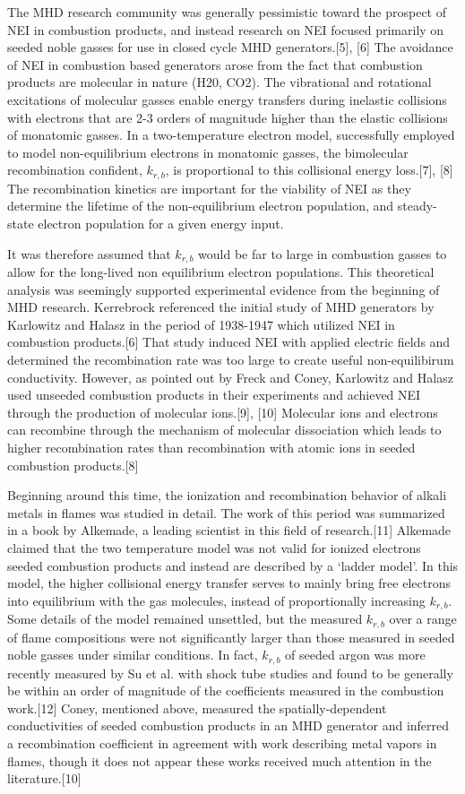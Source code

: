 The MHD research community was generally pessimistic toward the prospect of NEI in combustion products, and instead research on NEI focused primarily on seeded noble gasses for use in closed cycle MHD generators.[5], [6] The avoidance of NEI in combustion based generators arose from the fact that combustion products are molecular in nature (H20, CO2). The vibrational and rotational excitations of molecular gasses enable energy transfers during inelastic collisions with electrons that are 2-3 orders of magnitude higher than the elastic collisions of monatomic gasses. In a two-temperature electron model, successfully employed to model non-equilibrium electrons in monatomic gasses, the bimolecular recombination confident, $k_{r,b}$, is proportional to this collisional energy loss.[7], [8] The recombination kinetics are important for the viability of NEI as they determine the lifetime of the non-equilibrium electron population, and steady-state electron population for a given energy input. 

It was therefore assumed that $k_{r,b}$ would be far to large in combustion gasses to allow for the long-lived non equilibrium electron populations.
This theoretical analysis was seemingly supported experimental evidence from the beginning of MHD research. Kerrebrock referenced the initial study of MHD generators by Karlowitz and Halasz in the period of 1938-1947 which utilized NEI in combustion products.[6] That study induced NEI with applied electric fields and determined the recombination rate was too large to create useful non-equilibirum conductivity. However, as pointed out by Freck and Coney, Karlowitz and Halasz used unseeded combustion products in their experiments and achieved NEI through the production of molecular ions.[9], [10] Molecular ions and electrons can recombine through the mechanism of molecular dissociation  which leads to higher recombination rates than recombination with atomic ions in seeded combustion products.[8] 

Beginning around this time, the ionization and recombination behavior of alkali metals in flames was studied in detail. The work of this period was summarized in a book by Alkemade, a leading scientist in this field of research.[11] Alkemade claimed that the two temperature model was not valid for ionized electrons seeded combustion products and instead are described by a ‘ladder model’. In this model, the higher collisional energy transfer serves to mainly bring free electrons into equilibrium with the gas molecules, instead of proportionally increasing $k_{r,b}$. Some details of the model remained unsettled, but the measured $k_{r,b}$ over a range of flame compositions were not significantly larger than those measured in seeded noble gasses under similar conditions. In fact, $k_{r,b}$  of seeded argon was more recently measured by Su et al. with shock tube studies and found to be generally be within an order of magnitude of the coefficients measured in the combustion work.[12] Coney, mentioned above, measured the spatially-dependent conductivities of seeded combustion products in an MHD generator and inferred a recombination coefficient in agreement with work describing metal vapors in flames, though it does not appear these works received much attention in the literature.[10]

